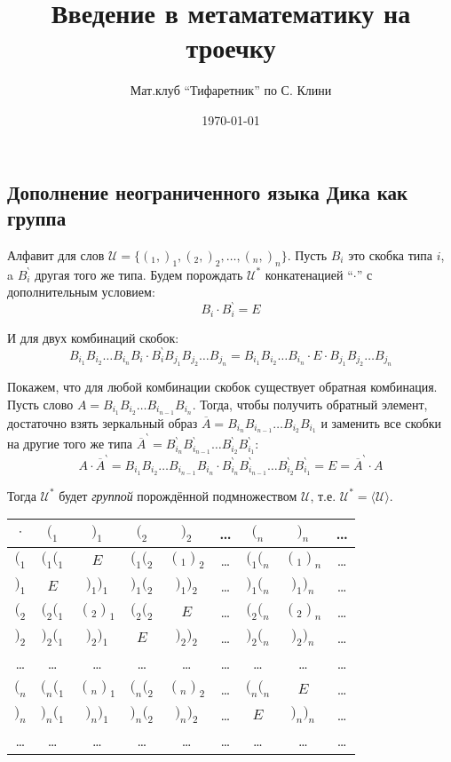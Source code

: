 \documentclass[a4paper, 12pt]{article}  %
\author{Мат.клуб ``Тифаретник'' по С. Клини}
\title{Введение в метаматематику на троечку}
\date{\today}
\theoremstyle{definition}
\begin{document}
	
	\subsection*{Дополнение неограниченного языка Дика как группа}
	
		Алфавит для слов $\mathscr{U} = \{ (_1, )_1, (_2, )_2, \dots, (_n, )_n \}$. Пусть $B_i$ это
		скобка типа $i$, a $B_i^{\backprime}$ другая того же типа. Будем порождать
		$\mathscr{U}^{\ast}$ конкатенацией ``$\cdot$'' с дополнительным условием:
			$$B_i  \cdot  B_i^{\backprime} = E$$
			
		И для двух комбинаций скобок:
			$$ B_{i_1}B_{i_2}\dots B_{i_n}B_i  \cdot  B_i^{\backprime}B_{j_1}B_{j_2}\dots B_{j_n} =
			B_{i_1}B_{i_2}\dots B_{i_n} \cdot E \cdot  B_{j_1}B_{j_2}\dots B_{j_n} $$
					
		Покажем, что для любой комбинации скобок существует обратная комбинация. Пусть слово 
		$A = B_{i_1}B_{i_2}\dots B_{i_{n-1}}B_{i_n}$. Тогда, чтобы получить обратный элемент,
		достаточно взять зеркальный образ $\overline{A}=B_{i_n}B_{i_{n-1}}\dots B_{i_2}B_{i_1}$ и
		заменить все скобки на другие того же типа 
		$\overline{A}^{\backprime}=B_{i_n}^{\backprime}B_{i_{n-1}}^{\backprime}\dots B_{i_2}^{\backprime}B_{i_1}^{\backprime}$:
		$$ A \cdot \overline{A}^{\backprime} = B_{i_1}B_{i_2}\dots B_{i_{n-1}}B_{i_n} \cdot
		  B_{i_n}^{\backprime}B_{i_{n-1}}^{\backprime}\dots B_{i_2}^{\backprime}B_{i_1}^{\backprime} =
		  E = \overline{A}^{\backprime} \cdot A $$
		
		Тогда $\mathscr{U}^{\ast}$ будет \textit{группой} порождённой подмножеством
		$\mathscr{U}$, т.е. $\mathscr{U}^{\ast} = \langle \mathscr{U} \rangle $.
		
		\begin{center}
			\begin{tabular}{|c||c|c|c|c|c|c|c|c}
				\hline
				$\cdot$ & $(_1$ & $)_1$ & $(_2$ & $)_2$ & \dots & $(_n$ & $)_n$ & \dots \\
				\hline
				\hline
				$(_1$ & $(_1(_1$ & $E$ & $(_1(_2$ & $(_1)_2$ & \dots  & $(_1(_n$ & $(_1)_n$ & \dots  \\
				\hline
				$)_1$ & $E$ & $)_1)_1$ & $)_1(_2$ & $)_1)_2$ & \dots  & $)_1(_n$ & $)_1)_n$ & \dots \\
				\hline
				 $(_2$ & $(_2(_1$ & $(_2)_1$ & $(_2(_2$ & $E$ & \dots & $(_2(_n$ & $(_2)_n$ & \dots  \\
				\hline
				$)_2$ & $)_2(_1$ & $)_2)_1$ & $E$ & $)_2)_2$ & \dots  & $)_2(_n$ & $)_2)_n$ & \dots  \\
				\hline
				\dots & \dots & \dots & \dots & \dots & \dots & \dots & \dots & \dots \\
				\hline
				$(_n$ & $(_n(_1$ & $(_n)_1$ & $(_n(_2$ & $(_n)_2$ & \dots & $(_n(_n$ & $E$ &\dots\\
				\hline
				$)_n$ & $)_n(_1$ & $)_n)_1$ & $)_n(_2$ & $)_n)_2$ & \dots & $E$ & $)_n)_n$ & \dots \\		
				\hline
				\dots & \dots & \dots & \dots & \dots & \dots & \dots & \dots & \dots \\		
			\end{tabular}
		\end{center}
\end{document}
